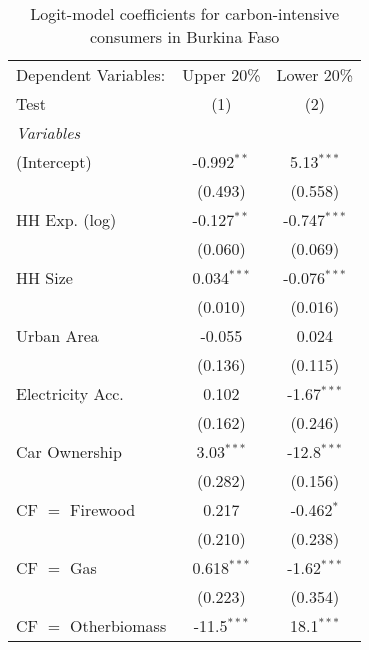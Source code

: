 
\begin{table}[htbp!]
   \centering
   \small
   \begin{adjustbox}{width = 1\textwidth, max height = 0.95\textheight, center}
      \begin{threeparttable}[b]
         \caption{\label{tab:Logit_1_BFA} Logit-model coefficients for carbon-intensive consumers in Burkina Faso}
         \begin{tabular}{lcc}
            \tabularnewline \midrule \midrule
            Dependent Variables: & Upper 20\%    & Lower 20\%\\   
            Test                 & (1)           & (2)\\  
            \midrule
            \emph{Variables}\\
            (Intercept)          & -0.992$^{**}$ & 5.13$^{***}$\\   
                                 & (0.493)       & (0.558)\\   
            HH Exp. (log)        & -0.127$^{**}$ & -0.747$^{***}$\\   
                                 & (0.060)       & (0.069)\\   
            HH Size              & 0.034$^{***}$ & -0.076$^{***}$\\   
                                 & (0.010)       & (0.016)\\   
            Urban Area           & -0.055        & 0.024\\   
                                 & (0.136)       & (0.115)\\   
            Electricity Acc.     & 0.102         & -1.67$^{***}$\\   
                                 & (0.162)       & (0.246)\\   
            Car Ownership        & 3.03$^{***}$  & -12.8$^{***}$\\   
                                 & (0.282)       & (0.156)\\   
            CF $=$ Firewood      & 0.217         & -0.462$^{*}$\\   
                                 & (0.210)       & (0.238)\\   
            CF $=$ Gas           & 0.618$^{***}$ & -1.62$^{***}$\\   
                                 & (0.223)       & (0.354)\\   
            CF $=$ Otherbiomass  & -11.5$^{***}$ & 18.1$^{***}$\\   

\end{tabular}
\end{threeparttable}
\end{adjustbox}
\end{table}
